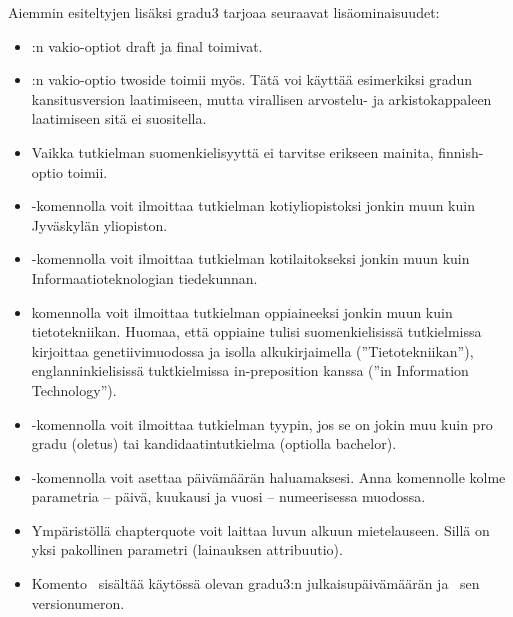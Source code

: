 \documentclass[utf8]{gradu3}
\begin{document}
Aiemmin esiteltyjen lisäksi gradu3 tarjoaa seuraavat lisäominaisuudet:
\begin{itemize}
\item \LaTeXe:n vakio-optiot draft ja final toimivat.
\item \LaTeXe:n vakio-optio twoside toimii myös.  Tätä voi käyttää
  esimerkiksi gradun kansitusversion laatimiseen, mutta virallisen
  arvostelu- ja arkistokappaleen laatimiseen sitä ei suositella.
\item Vaikka tutkielman suomenkielisyyttä ei tarvitse erikseen
  mainita, finnish-optio toimii.
\item \string\university-komennolla voit ilmoittaa tutkielman
  kotiyliopistoksi jonkin muun kuin Jyväskylän yliopiston.
\item  \string\department-komennolla voit ilmoittaa tutkielman
  kotilaitokseksi jonkin muun kuin Informaatioteknologian tiedekunnan.
\item \string\subject-komennolla voit ilmoittaa tutkielman
  oppiaineeksi jonkin muun kuin tietotekniikan.  Huomaa, että oppiaine
  tulisi suomenkielisissä tutkielmissa kirjoittaa genetiivimuodossa ja
  isolla alkukirjaimella (''Tietotekniikan''), englanninkielisissä
  tuktkielmissa in-preposition kanssa (''in Information Technology'').
\item \string\type-komennolla voit ilmoittaa tutkielman tyypin, jos se
  on jokin muu kuin pro gradu (oletus) tai kandidaatintutkielma
  (optiolla bachelor).
\item \string\setdate-komennolla voit asettaa päivämäärän
  haluamaksesi.  Anna komennolle kolme parametria -- päivä,
  kuukausi ja vuosi -- numeerisessa muodossa.
\item Ympäristöllä chapterquote voit laittaa luvun alkuun
  mietelauseen.  Sillä on yksi pakollinen parametri (lainauksen
  attribuutio).
\item Komento \string\graduclsdate\ sisältää käytössä olevan gradu3:n
  julkaisupäivämäärän ja \string\graduclsversion\ sen versionumeron.
\end{itemize}
\end{document}
